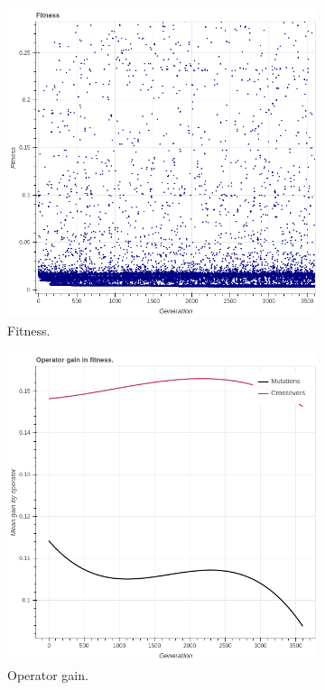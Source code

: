  \begin{figure}
    \begin{subfigure}{0.6\textwidth}
        \includegraphics[width=0.8\linewidth]{figures/incrementalfitness30d.png}
        \caption{Fitness.}
    \end{subfigure}
    \begin{subfigure}{0.6\textwidth}
        \includegraphics[width=0.8\linewidth]{figures/incrementaloperatorgain30d.png}
        \caption{Operator gain.}
    \end{subfigure}
        \begin{subfigure}{0.6\textwidth}

\end{subfigure}
\end{figure}
